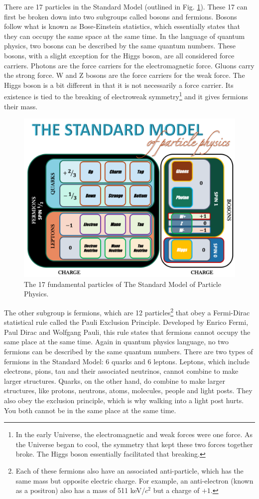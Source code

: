 There are 17 particles in the Standard Model (outlined in Fig. \ref{fig:standard_model}). These 17 can first be broken down into two subgroups called bosons and fermions. Bosons follow what is known as Bose-Einstein statistics, which essentially states that they can occupy the same space at the same time. In the language of quantum physics, two bosons can be described by the same quantum numbers. These bosons, with a slight exception for the Higgs boson, are all considered force carriers. Photons are the force carriers for the electromagnetic force. Gluons carry the strong force. W and Z bosons are the force carriers for the weak force. The Higgs boson is a bit different in that it is not necessarily a force carrier. Its existence is tied to the breaking of electroweak symmetry\footnote{In the early Universe, the electromagnetic and weak forces were one force. As the Universe began to cool, the symmetry that kept these two forces together broke. The Higgs boson essentially facilitated that breaking.} and it gives fermions their mass.

\begin{figure}[h!]
	\centering
	\includegraphics[width=0.8\linewidth]{figures/standard_model.png}
	\caption{The 17 fundamental particles of The Standard Model of Particle Physics.}
	\label{fig:standard_model}
\end{figure}

The other subgroup is fermions, which are 12 particles\footnote{Each of these fermions also have an associated anti-particle, which has the same mass but opposite electric charge. For example, an anti-electron (known as a positron) also has a mass of 511 keV/$c^2$ but a charge of $+1$.} that obey a Fermi-Dirac statistical rule called the Pauli Exclusion Principle. Developed by Enrico Fermi, Paul Dirac and Wolfgang Pauli, this rule states that fermions cannot occupy the same place at the same time. Again in quantum physics language, no two fermions can be described by the same quantum numbers. There are two types of fermions in the Standard Model: 6 quarks and 6 leptons. Leptons, which include electrons, pions, tau and their associated neutrinos, cannot combine to make larger structures. Quarks, on the other hand, do combine to make larger structures, like protons, neutrons, atoms, molecules, people and light posts. They also obey the exclusion principle, which is why walking into a light post hurts. You both cannot be in the same place at the same time.

